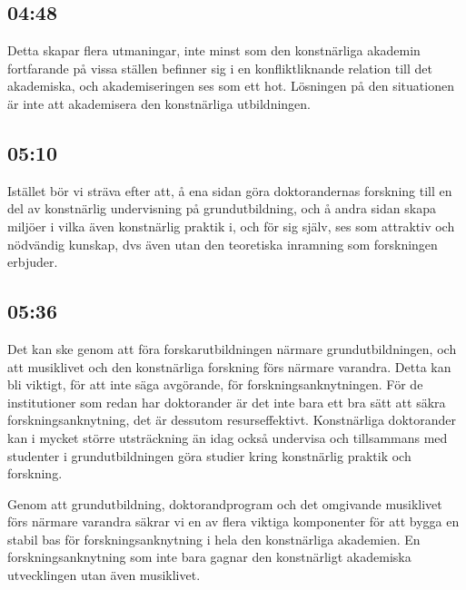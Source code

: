 \documentclass[11pt]{article}
\begin{document}
\subsection*{04:48}
\label{sec:org7158d90}
Detta skapar flera utmaningar, inte minst som den konstnärliga akademin fortfarande på vissa ställen befinner sig i en konfliktliknande relation till det akademiska, och akademiseringen ses som ett hot. Lösningen på den situationen är inte att akademisera den konstnärliga utbildningen.
\subsection*{05:10}
\label{sec:orge27e3f4}
Istället bör vi sträva efter att, å ena sidan göra doktorandernas forskning till en del av konstnärlig undervisning på grundutbildning, och å andra sidan skapa miljöer i vilka även konstnärlig praktik i, och för sig själv, ses som attraktiv och nödvändig kunskap, dvs även utan den teoretiska inramning som forskningen erbjuder.
\subsection*{05:36}
\label{sec:org14a1163}
Det kan ske genom att föra forskarutbildningen närmare grundutbildningen, och att musiklivet och den konstnärliga forskning förs närmare varandra. Detta kan bli viktigt, för att inte säga avgörande, för forskningsanknytningen. För de institutioner som redan har doktorander är det inte bara ett bra sätt att säkra forskningsanknytning, det är dessutom resurseffektivt. Konstnärliga doktorander kan i mycket större utsträckning än idag också undervisa och tillsammans med studenter i grundutbildningen göra studier kring konstnärlig praktik och forskning.

Genom att grundutbildning, doktorandprogram och det omgivande musiklivet förs närmare varandra säkrar vi en av flera viktiga komponenter för att bygga en stabil bas för forskningsanknytning i hela den konstnärliga akademien. En forskningsanknytning som inte bara gagnar den konstnärligt akademiska utvecklingen utan även musiklivet.
\end{document}
